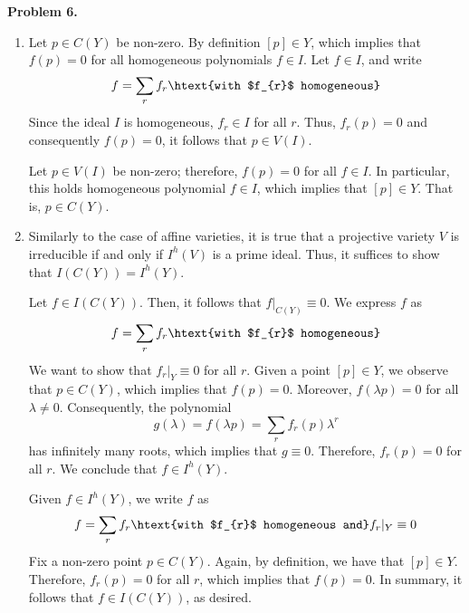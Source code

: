 \documentclass{article}
\begin{document}
\vspace{5mm}
\noindent\textbf{Problem 6.}
\begin{enumerate}
    \item[(a)] Let $p\in C(Y)$ be non-zero. By definition $[p]\in Y$, which implies that $f(p)=0$ 
    for all homogeneous polynomials $f\in I$. Let $f\in I$, and write
    \begin{equation*}
        f=\sum_{r}f_{r} \htext{with $f_{r}$ homogeneous}
    \end{equation*}
    Since the ideal $I$ is homogeneous, $f_{r}\in I$ for all $r$. Thus, $f_{r}(p)=0$ and 
    consequently $f(p)=0$, it follows that $p\in V(I)$.

    Let $p\in V(I)$ be non-zero; therefore, $f(p)=0$ for all $f\in I$. In particular, this holds
    homogeneous polynomial $f\in I$, which implies that $[p]\in Y$. That is, $p\in C(Y)$.

    \item[(b)] Similarly to the case of affine varieties, it is true that a projective variety $V$ 
    is irreducible if and only if $I^{h}(V)$ is a prime ideal. Thus, it suffices to show that 
    $I(C(Y))=I^{h}(Y)$.

    Let $f\in I(C(Y))$. Then, it follows that $f|_{C(Y)}\equiv0$. We express $f$ as
    \begin{equation*}
        f=\sum_{r}f_{r} \htext{with $f_{r}$ homogeneous}
    \end{equation*}
    We want to show that $f_{r}|_{Y}\equiv0$ for all $r$. Given a point $[p]\in Y$, we observe 
    that $p\in C(Y)$, which implies that $f(p)=0$. Moreover, $f(\lambda p)=0$ for all 
    $\lambda\neq0$. Consequently, the polynomial
    \begin{equation*}
        g(\lambda)=f(\lambda p)=\sum_{r}f_{r}(p)\lambda^{r}
    \end{equation*}
    has infinitely many roots, which implies that $g\equiv0$. Therefore, $f_{r}(p)=0$ for all $r$.
    We conclude that $f\in I^{h}(Y)$.

    Given $f\in I^{h}(Y)$, we write $f$ as
    \begin{equation*}
        f=\sum_{r}f_{r} \htext{with $f_{r}$ homogeneous and}f_{r}|_{Y}\equiv0
    \end{equation*}
    Fix a non-zero point $p\in C(Y)$. Again, by definition, we have that $[p]\in Y$. Therefore, 
    $f_{r}(p)=0$ for all $r$, which implies that $f(p)=0$. In summary, it follows that 
    $f\in I(C(Y))$, as desired.
\end{enumerate}

\end{document}
